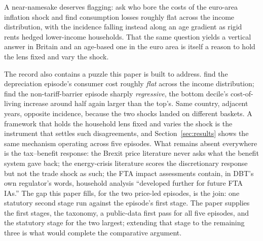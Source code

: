 A near-namesake deserves flagging: \citet{pallotti2023} ask who bore
the costs of the euro-area inflation shock and find consumption losses
roughly flat across the income distribution, with the incidence
falling instead along an age gradient as rigid rents hedged lower-income
households. That the same question yields a vertical answer in Britain
and an age-based one in the euro area is itself a reason to hold the
lens fixed and vary the shock.

The record also contains a puzzle this paper is built to address.
\citet{breinlich2022} find the depreciation episode's consumer cost
roughly \emph{flat} across the income distribution; \citet{bakker2026}
find the non-tariff-barrier episode sharply \emph{regressive}, the
bottom decile's cost-of-living increase around half again larger than
the top's. Same country, adjacent years, opposite incidence, because
the two shocks landed on different baskets. A framework that holds the
household lens fixed and varies the shock is the instrument that
settles such disagreements, and Section~\ref{sec:results} shows the
same mechanism operating across five episodes. What remains absent
everywhere is the tax--benefit response: the Brexit price literature
never asks what the benefit system gave back; the energy-crisis literature scores the discretionary response
but not the trade shock as such; the FTA impact assessments contain, in
DBT's own regulator's words, household analysis ``developed further for
future FTA IAs.'' The gap this paper fills, for the two price-led episodes, is the
join: one statutory second stage run against the episode's first
stage. The paper supplies the first stages, the taxonomy, a
public-data first pass for all five episodes, and the statutory stage
for the two largest; extending that stage to the remaining three is
what would complete the comparative argument.
